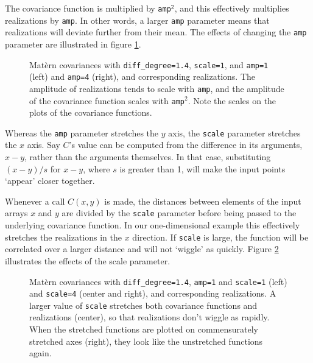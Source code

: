 The covariance function is multiplied by \texttt{amp}$^\texttt{2}$, and this effectively multiplies realizations by \texttt{amp}. In other words, a larger \texttt{amp} parameter means that realizations will deviate further from their mean. The effects of changing the \texttt{amp} parameter are illustrated in figure \ref{fig:amp}.
\begin{figure}
    \centering
    \caption{Mat\`ern covariances with \texttt{diff_degree=1.4}, \texttt{scale=1}, and \texttt{amp=1} (left) and \texttt{amp=4} (right), and corresponding realizations. The amplitude of realizations tends to scale with \texttt{amp}, and the amplitude of the covariance function scales with \texttt{amp}$^2$. Note the scales on the plots of the covariance functions.}
    \label{fig:amp}
\end{figure}

Whereas the \texttt{amp} parameter stretches the $y$ axis, the \texttt{scale} parameter stretches the $x$ axis. Say $C$'s value can be computed from the difference in its arguments, $x-y$, rather than the arguments themselves. In that case, substituting $(x-y)/s$ for $x-y$, where $s$ is greater than 1, will make the input points `appear' closer together.

Whenever a call $C(x,y)$ is made, the distances between elements of the input arrays $x$ and $y$ are divided by the \texttt{scale} parameter before being passed to the underlying covariance function. In our one-dimensional example this effectively stretches the realizations in the $x$ direction. If \texttt{scale} is large, the function will be correlated over a larger distance and will not `wiggle' as quickly. Figure \ref{fig:scale} illustrates the effects of the scale parameter.
\begin{figure}
    \centering
    \caption{Mat\`ern covariances with \texttt{diff_degree=1.4}, \texttt{amp=1} and \texttt{scale=1} (left) and \texttt{scale=4} (center and right), and corresponding realizations. A larger value of \texttt{scale} stretches both covariance functions and realizations (center), so that realizations don't wiggle as rapidly. When the stretched functions are plotted on commensurately stretched axes (right), they look like the unstretched functions again.}
    \label{fig:scale}
\end{figure}

